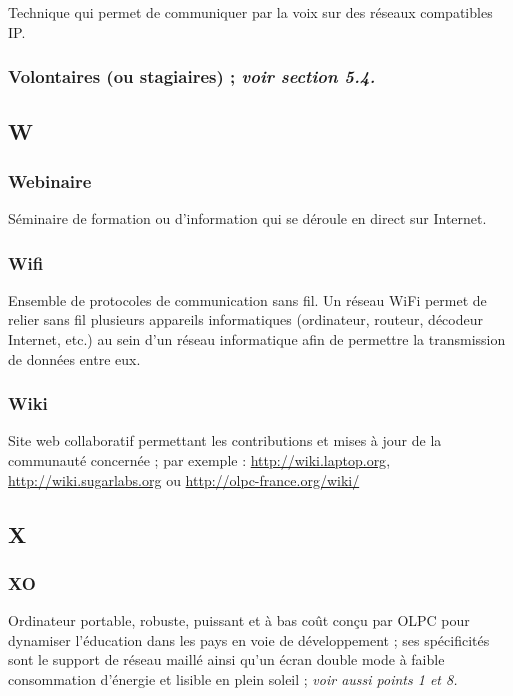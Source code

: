 \documentclass[12pt]{article}
\begin{document}
Technique qui permet de communiquer par la voix sur des réseaux compatibles
IP.
\subsubsection{Volontaires (ou stagiaires) ; \emph{voir section 5.4.}}
\label{sec-14-17-3}
\subsection{W}
\label{sec-14-18}
\subsubsection{Webinaire}
\label{sec-14-18-1}


Séminaire de formation ou d'information qui se déroule en direct sur
Internet.
\subsubsection{Wifi}
\label{sec-14-18-2}


Ensemble de protocoles de communication sans fil. Un réseau WiFi permet de
relier sans fil plusieurs appareils informatiques (ordinateur, routeur,
décodeur Internet, etc.) au sein d'un réseau informatique afin de permettre
la transmission de données entre eux.
\subsubsection{Wiki}
\label{sec-14-18-3}


Site web collaboratif permettant les contributions et mises à jour de la
communauté concernée ; par exemple : \href{http://wiki.laptop.org}{http://wiki.laptop.org},
\href{http://wiki.sugarlabs.org}{http://wiki.sugarlabs.org} ou \href{http://olpc-france.org/wiki/}{http://olpc-france.org/wiki/}
\subsection{X}
\label{sec-14-19}
\subsubsection{XO}
\label{sec-14-19-1}


Ordinateur portable, robuste, puissant et à bas coût conçu par OLPC pour
dynamiser l'éducation dans les pays en voie de développement ; ses
spécificités sont le support de réseau maillé ainsi qu'un écran double mode
à faible consommation d'énergie et lisible en plein soleil ; \emph{voir aussi points 1 et 8.}
\end{document}
